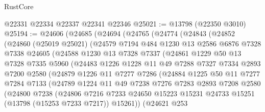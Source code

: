 \begin{lexlean}{RustCore}
\begin{coremodule}
    @22331
    @22334
    @22337
    @22341
    @22346
@25021 := @13798 (@22350 @3010)
@25194 := @24606
    (@24685
      (@24694
        (@24765
          (@24774
            (@24843
              (@24852
                (@24860
                  (@25019 @25021)
                  (@24579
                    @7194
                    @484
                    @1230
                    @13
                    @2586
                    @6876
                    @7328
                    @7338
                    @24605
                    (@24588
                      @1230
                      @13
                      @7328
                      @7337
                      (@24861
                        @1229
                        @50
                        @13
                        @7328
                        @7335
                        @5960
                        (@24483
                          @1226
                          @1228
                          @11
                          @49
                          @7288
                          @7327
                          @7334
                          @2893
                          @7200
                          @2580
                          (@24879
                            @1226
                            @11
                            @7277
                            @7286
                            (@24884
                              @1225
                              @50
                              @11
                              @7277
                              @7284
                              @7133
                              (@24789
                                @1224
                                @11
                                @49
                                @7238
                                @7276
                                @7283
                                @2893
                                @7208
                                @2580
                                (@24800
                                  @7238
                                  (@24806
                                    @7216
                                    @7233
                                    @24650
                                    @15223
                                    @15231
                                    @24733
                                    @15251
                                    (@13798 (@15253 @7233 @7217))
                                    @15261))
                                (@24621
                                  @253

\end{coremodule}
\end{lexlean}

